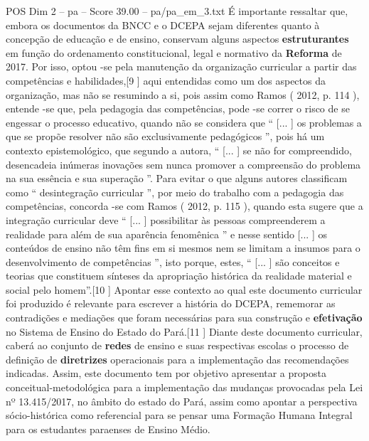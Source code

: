 \begin{textsample}{POS Dim 2 – pa – Score 39.00 – pa/pa\_em\_3.txt}
É importante ressaltar que, embora os documentos da BNCC e o DCEPA sejam diferentes quanto à concepção de educação e de ensino, conservam alguns aspectos \textbf{estruturantes} em função do ordenamento constitucional, legal e normativo da \textbf{Reforma} de 2017.
Por isso, optou -se pela manutenção da organização curricular a partir das competências e habilidades,[9 ] aqui entendidas como um dos aspectos da organização, mas não se resumindo a si, pois assim como Ramos ( 2012, p. 114 ), entende -se que, pela pedagogia das competências, pode -se correr o risco de se engessar o processo educativo, quando não se considera que “ [... ] os problemas a que se propõe resolver não são exclusivamente pedagógicos ”, pois há um contexto epistemológico, que segundo a autora, “ [... ] se não for compreendido, desencadeia inúmeras inovações sem nunca promover a compreensão do problema na sua essência e sua superação ”.
Para evitar o que alguns autores classificam como “ desintegração curricular ”, por meio do trabalho com a pedagogia das competências, concorda -se com Ramos ( 2012, p. 115 ), quando esta sugere que a integração curricular deve “ [... ] possibilitar às pessoas compreenderem a realidade para além de sua aparência fenomênica ” e nesse sentido [... ] os conteúdos de ensino não têm fins em si mesmos nem se limitam a insumos para o desenvolvimento de competências ”, isto porque, estes, “ [... ] são conceitos e teorias que constituem sínteses da apropriação histórica da realidade material e social pelo homem”.[10 ] Apontar esse contexto ao qual este documento curricular foi produzido é relevante para escrever a história do DCEPA, rememorar as contradições e mediações que foram necessárias para sua construção e \textbf{efetivação} no Sistema de Ensino do Estado do Pará.[11 ] Diante deste documento curricular, caberá ao conjunto de \textbf{redes} de ensino e suas respectivas escolas o processo de definição de \textbf{diretrizes} operacionais para a implementação das recomendações indicadas.
Assim, este documento tem por objetivo apresentar a proposta conceitual-metodológica para a implementação das mudanças provocadas pela Lei nº 13.415/2017, no âmbito do estado do Pará, assim como apontar a perspectiva sócio-histórica como referencial para se pensar uma Formação Humana Integral para os estudantes paraenses de Ensino Médio.

\end{textsample}
